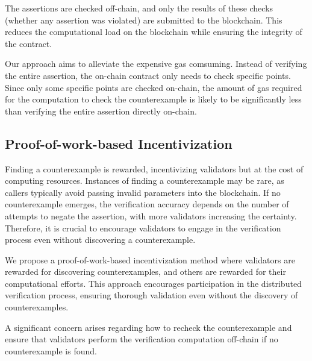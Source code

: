 \documentclass[runningheads]{llncs}
\begin{document}
The assertions are checked off-chain, and only the results of these checks (whether any assertion was violated) are submitted to the blockchain. This reduces the computational load on the blockchain while ensuring the integrity of the contract.

Our approach aims to alleviate the expensive gas comsuming. Instead of verifying the entire assertion, the on-chain contract only needs to check specific points. Since only some specific points are checked on-chain, the amount of gas required for the computation to check the counterexample is likely to be significantly less than verifying the entire assertion directly on-chain.

 




\subsection{Proof-of-work-based Incentivization}
Finding a counterexample is rewarded, incentivizing validators but at the cost of computing resources. Instances of finding a counterexample may be rare, as callers typically avoid passing invalid parameters into the blockchain. If no counterexample emerges, the verification accuracy depends on the number of attempts to negate the assertion, with more validators increasing the certainty. Therefore, it is crucial to encourage validators to engage in the verification process even without discovering a counterexample. %

We propose a proof-of-work-based incentivization method where validators are rewarded for discovering counterexamples, and others are rewarded for their computational efforts. This approach encourages participation in the distributed verification process, ensuring thorough validation even without the discovery of counterexamples.

A significant concern arises regarding how to recheck the counterexample and ensure that validators perform the verification computation off-chain if no counterexample is found.
\end{document}
